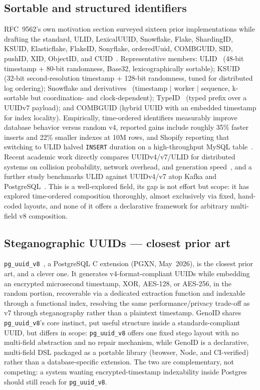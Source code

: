 \documentclass[conference]{IEEEtran}
\begin{document}
\subsection{Sortable and structured identifiers}
RFC~9562's own motivation section surveyed sixteen prior implementations while drafting the standard, ULID, LexicalUUID, Snowflake, Flake, ShardingID, KSUID, Elasticflake, FlakeID, Sonyflake, orderedUuid, COMBGUID, SID, pushID, XID, ObjectID, and CUID~\cite{1}. Representative members: ULID~\cite{2} (48-bit timestamp + 80-bit randomness, Base32, lexicographically sortable); KSUID~\cite{3} (32-bit second-resolution timestamp + 128-bit randomness, tuned for distributed log ordering); Snowflake and derivatives~\cite{4} (timestamp $|$ worker $|$ sequence, k-sortable but coordination- and clock-dependent); TypeID~\cite{5} (typed prefix over a UUIDv7 payload); and COMBGUID (hybrid UUID with an embedded timestamp for index locality). Empirically, time-ordered identifiers measurably improve database behavior versus random v4, reported gains include roughly 35\% faster inserts and 22\% smaller indexes at 10M rows, and Shopify reporting that switching to ULID halved \texttt{INSERT} duration on a high-throughput MySQL table~\cite{15,16}. Recent academic work directly compares UUIDv4/v7/ULID for distributed systems on collision probability, network overhead, and generation speed~\cite{12}, and a further study benchmarks ULID against UUIDv4/v7 atop Kafka and PostgreSQL~\cite{13}. This is a well-explored field, its gap is not effort but scope: it has explored time-ordered composition thoroughly, almost exclusively via fixed, hand-coded layouts, and none of it offers a declarative framework for arbitrary multi-field v8 composition.
\subsection{Steganographic UUIDs — closest prior art}
\texttt{pg\_uuid\_v8}~\cite{8}, a PostgreSQL C extension (PGXN, May~2026), is the closest prior art, and a clever one. It generates v4-format-compliant UUIDs while embedding an encrypted microsecond timestamp, XOR, AES-128, or AES-256, in the random portion, recoverable via a dedicated extraction function and indexable through a functional index, resolving the same performance/privacy trade-off as v7 through steganography rather than a plaintext timestamp. GenoID shares \texttt{pg\_uuid\_v8}'s core instinct, put useful structure inside a standards-compliant UUID, but differs in scope: \texttt{pg\_uuid\_v8} offers one fixed stego layout with no multi-field abstraction and no repair mechanism, while GenoID is a declarative, multi-field DSL packaged as a portable library (browser, Node, and CI-verified) rather than a database-specific extension. The two are complementary, not competing: a system wanting encrypted-timestamp indexability inside Postgres should still reach for \texttt{pg\_uuid\_v8}.
\end{document}
